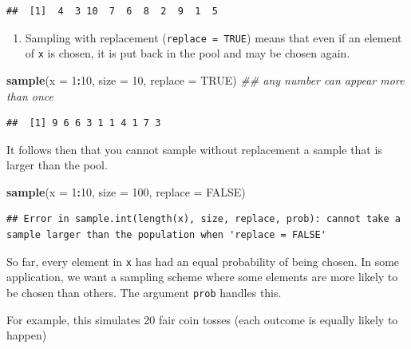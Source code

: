 \documentclass[
]{book}
\newenvironment{Shaded}{\begin{snugshade}}{\end{snugshade}}
\newcommand{\CommentTok}[1]{\textcolor[rgb]{0.56,0.35,0.01}{\textit{#1}}}
\newcommand{\DataTypeTok}[1]{\textcolor[rgb]{0.13,0.29,0.53}{#1}}
\newcommand{\DecValTok}[1]{\textcolor[rgb]{0.00,0.00,0.81}{#1}}
\newcommand{\KeywordTok}[1]{\textcolor[rgb]{0.13,0.29,0.53}{\textbf{#1}}}
\newcommand{\NormalTok}[1]{#1}
\newcommand{\OperatorTok}[1]{\textcolor[rgb]{0.81,0.36,0.00}{\textbf{#1}}}
\newcommand{\OtherTok}[1]{\textcolor[rgb]{0.56,0.35,0.01}{#1}}
\providecommand{\tightlist}{%
  \setlength{\itemsep}{0pt}\setlength{\parskip}{0pt}}
\theoremstyle{definition}
\theoremstyle{definition}
\theoremstyle{definition}
\theoremstyle{remark}
\begin{document}
\begin{verbatim}
##  [1]  4  3 10  7  6  8  2  9  1  5
\end{verbatim}

\begin{enumerate}
\def\labelenumi{\arabic{enumi}.}
\setcounter{enumi}{1}
\tightlist
\item
  Sampling with replacement (\texttt{replace\ =\ TRUE}) means that even if an element of \texttt{x} is chosen, it is put back in the pool and may be chosen again.
\end{enumerate}

\begin{Shaded}
\begin{Highlighting}[]
\KeywordTok{sample}\NormalTok{(}\DataTypeTok{x =} \DecValTok{1}\OperatorTok{:}\DecValTok{10}\NormalTok{, }\DataTypeTok{size =} \DecValTok{10}\NormalTok{, }\DataTypeTok{replace =} \OtherTok{TRUE}\NormalTok{) }\CommentTok{\#\# any number can appear more than once}
\end{Highlighting}
\end{Shaded}

\begin{verbatim}
##  [1] 9 6 6 3 1 1 4 1 7 3
\end{verbatim}

It follows then that you cannot sample without replacement a sample that is larger than the pool.

\begin{Shaded}
\begin{Highlighting}[]
\KeywordTok{sample}\NormalTok{(}\DataTypeTok{x =} \DecValTok{1}\OperatorTok{:}\DecValTok{10}\NormalTok{, }\DataTypeTok{size =} \DecValTok{100}\NormalTok{, }\DataTypeTok{replace =} \OtherTok{FALSE}\NormalTok{)}
\end{Highlighting}
\end{Shaded}

\begin{verbatim}
## Error in sample.int(length(x), size, replace, prob): cannot take a sample larger than the population when 'replace = FALSE'
\end{verbatim}

So far, every element in \texttt{x} has had an equal probability of being chosen. In some application, we want a sampling scheme where some elements are more likely to be chosen than others. The argument \texttt{prob} handles this.

For example, this simulates 20 fair coin tosses (each outcome is equally likely to happen)
\end{document}
